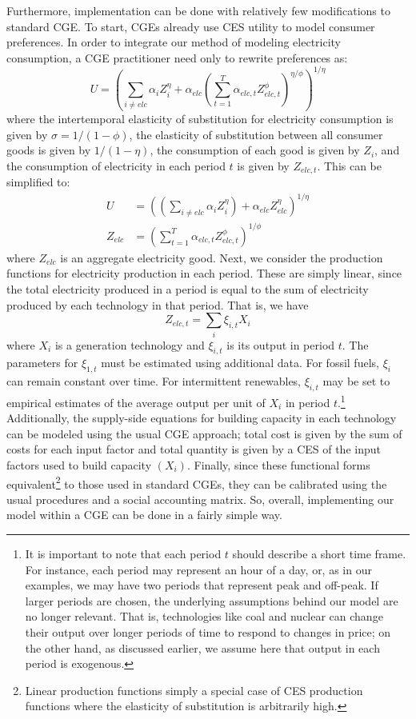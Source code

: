 \documentclass[11pt,a4paper]{extarticle}
\begin{document}
Furthermore, implementation can be done with relatively few modifications to standard CGE. To start, CGEs already use CES utility to model consumer preferences. In order to integrate our method of modeling electricity consumption, a CGE practitioner need only to rewrite preferences as:
\begin{equation}
U =   \left( \sum_{i \neq elc} \alpha_{i} Z_{i}^\eta +  \alpha_{elc} \left( \sum_{t=1}^T \alpha_{elc,t} Z_{elc, t}^\phi \right)^{\eta/\phi} \right)^{1/\eta}
\end{equation}
where the intertemporal elasticity of substitution for electricity consumption is given by $\sigma = 1/(1-\phi)$,  the elasticity of substitution between all consumer goods is given by $1/(1-\eta)$, the consumption of each good is given by $Z_{i}$, and the consumption of electricity in each period $t$ is given by $Z_{elc, t}$. This can be simplified to: 
\begin{align}
U &= \left(  \left( \sum_{i \neq elc} \alpha_{i} Z_{i}^\eta \right) + \alpha_{elc} Z_{elc}^\eta \right)^{1/\eta} \\
Z_{elc} &= \left(  \sum_{t=1}^T \alpha_{elc,t} Z_{elc, t}^\phi \right)^{1/\phi}
\end{align}
where $Z_{elc}$ is an aggregate electricity good. Next, we consider the production functions for electricity production in each period. These are simply linear, since the total  electricity produced in a period is equal to the sum of electricity produced by each technology in that period. That is, we have 
\begin{equation}
Z_{elc,t} = \sum_i \xi_{i,t} X_i 
\end{equation}
where $X_i$ is a generation technology and $\xi_{i,t}$ is its output in period $t$. The parameters for $\xi_{1,t}$ must be estimated using additional data. For fossil fuels, $\xi_i$ can remain constant over time. For intermittent renewables, $\xi_{i,t}$ may be set to empirical estimates of the average output per unit of $X_i$ in period $t$.\footnote{It is important to note that each period $t$ should describe a short time frame. For instance, each period may represent an hour of a day, or, as in our examples, we may have two periods that represent peak and off-peak. If larger periods are chosen, the underlying assumptions behind our model are no longer relevant. That is, technologies like coal and nuclear can change their output over longer periods of time to respond to changes in price; on the other hand, as discussed earlier, we assume here that output in each period is exogenous.}  Additionally, the supply-side equations for building capacity in each technology can be modeled using the usual  CGE approach; total cost is given by the sum of costs for each input factor and total quantity is given by a CES of the input factors used to build capacity $(X_i)$. Finally, since these functional forms equivalent\footnote{Linear production functions simply a special case of CES production functions where the elasticity of substitution is arbitrarily high.} to those used in standard CGEs, they can be calibrated using the usual procedures and a social accounting matrix. So, overall, implementing our model within a CGE can be done in a fairly simple way. 
\end{document}

